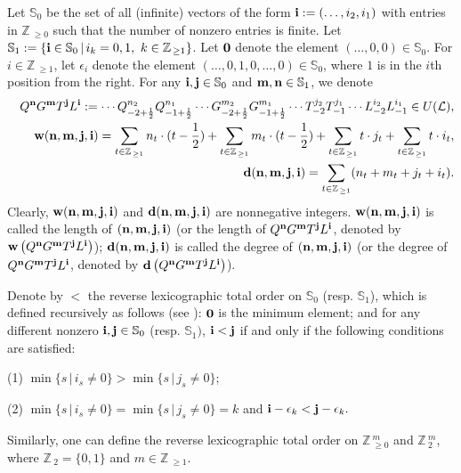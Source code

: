 \documentclass[12pt]{article}
\def\ssc{\scriptscriptstyle}
\def\Z{\mathbb{Z}{\ssc\,}}
\numberwithin{equation}{section}
\begin{document}
Let  $\mathbb{S}_0$  be  the set of all (infinite) vectors of the form ${\bf i}:=(\ldots, i_2,i_1)$ with entries in $\Z_{\ge 0}$ such that the number of nonzero entries is finite. Let
$\mathbb{S}_1:=\{{\bf{i}}\in \mathbb{S}_0\,|\,i_k=0,1, \ k\in \Z_{\ge 1}\}$.
Let ${\bf 0}$ denote the element $(\ldots,0,0)\in \mathbb{S}_0$. For $i\in\Z_{\ge 1}$, let $\epsilon_i$ denote the element $(\ldots,0,1,0,\ldots,0)\in\mathbb{S}_0$, where $1$ is
in the $i$th position from the right.
For any ${\bf i, j}\in \mathbb{S}_0$ and ${\bf m,n}\in \mathbb{S}_1$, we denote
\begin{eqnarray*}
&&Q^{\bf n}G^{\bf m}T^{\bf j}L^{\bf i}:=\cdots Q_{-2+\frac{1}{2}}^{n_{2}} Q_{-1+\frac{1}{2}}^{n_{1}}\cdots G_{-2+\frac{1}{2}}^{m_{2}} G_{-1+\frac{1}{2}}^{m_{1}}
\cdots T_{-2}^{j_{2}} T_{-1}^{j_{1}}\cdots L_{-2}^{i_{2}} L_{-1}^{i_{1}}\in U({\mathcal{L}}),\\
&&{\bf w(n,m,j,i)}=\sum\limits_{t\in\Z_{\ge 1}}n_t\cdot (t-\frac{1}{2})+\sum\limits_{t\in\Z_{\ge 1}}m_t\cdot (t-\frac{1}{2})+\sum\limits_{t\in\Z_{\ge 1}}t\cdot j_t+\sum\limits_{t\in\Z_{\ge 1}}t\cdot i_t,\\
&& {\bf d(n,m,j,i)}=\sum\limits_{t\in\Z_{\ge 1}} (n_t+m_t+j_t+i_t).
\end{eqnarray*}
Clearly, ${\bf w(n,m,j,i)}$ and ${\bf d(n,m,j,i)}$ are  nonnegative integers.
${\bf w(n,m,j,i)}$ is called the length of ${\bf (n,m,j,i)}$ (or the length of $ Q^{\bf n}G^{\bf m}T^{\bf j}L^{\bf i}$, denoted by ${\bf w}\left(Q^{\bf n}G^{\bf m}T^{\bf j}L^{\bf i}\right)$);  ${\bf d(n,m,j,i)}$ is called the degree of  ${\bf (n,m,j,i)}$ (or the degree of $Q^{\bf n}G^{\bf m}T^{\bf j}L^{\bf i}$, denoted by  ${\bf d}\left(Q^{\bf n}G^{\bf m}T^{\bf j}L^{\bf i}\right)$).



Denote by $<$ the reverse lexicographic total order on $\mathbb{S}_0$ (resp. $\mathbb{S}_1$), which is defined recursively  as follows (see \cite{MZ1,LPX20,G}): $\bf 0$ is the minimum element; and for any different nonzero ${\bf i,j}\in \mathbb{S}_0$ (resp. $\mathbb{S}_1)$, ${\bf i}<{\bf j}$ if and only if the following conditions are satisfied:

(1) $\min\{s\,|\,i_s\ne 0\}>\min\{s\,|\,j_s\ne 0\}$;

(2) $\min\{s\,|\,i_s\ne 0\}=\min\{s\,|\,j_s\ne 0\}=k$ and ${\bf i}-\epsilon_k<{\bf j}-\epsilon_k.$

Similarly, one can  define the reverse lexicographic total order on $\Z^m_{\ge 0}$ and $\Z_2^m$, where $\Z_2=\{0,1\}$ and $ m\in\Z_{\ge 1}.$
\end{document}
